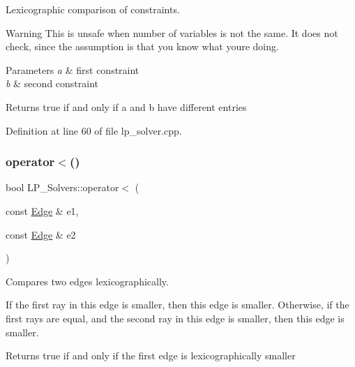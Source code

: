 Lexicographic comparison of constraints. 

\begin{DoxyWarning}{Warning}
This is unsafe when number of variables is not the same. It does not check, since the assumption is that you know what you\textquotesingle{}re doing. 
\end{DoxyWarning}

\begin{DoxyParams}{Parameters}
{\em a} & first constraint \\
\hline
{\em b} & second constraint \\
\hline
\end{DoxyParams}
\begin{DoxyReturn}{Returns}
{\ttfamily true} if and only if {\ttfamily a} and {\ttfamily b} have different entries 
\end{DoxyReturn}


Definition at line 60 of file lp\+\_\+solver.\+cpp.

\mbox{\label{namespace_l_p___solvers_aa582ccdb98a58f0c688aefa89bb7cdf1}} 
\subsubsection{\texorpdfstring{operator$<$()}{operator<()}\hspace{0.1cm}{\footnotesize\ttfamily [2/3]}}
{\footnotesize\ttfamily bool L\+P\+\_\+\+Solvers\+::operator$<$ (\begin{DoxyParamCaption}\item[{const \hyperlink{group___c_l_s_solvers_class_l_p___solvers_1_1_edge}{Edge} \&}]{e1,  }\item[{const \hyperlink{group___c_l_s_solvers_class_l_p___solvers_1_1_edge}{Edge} \&}]{e2 }\end{DoxyParamCaption})}



Compares two edges lexicographically. 

If the first ray in {\ttfamily this} edge is smaller, then {\ttfamily this} edge is smaller. Otherwise, if the first rays are equal, and the second ray in {\ttfamily this} edge is smaller, then {\ttfamily this} edge is smaller.

\begin{DoxyReturn}{Returns}
{\ttfamily true} if and only if the first edge is lexicographically smaller
\end{DoxyReturn}

